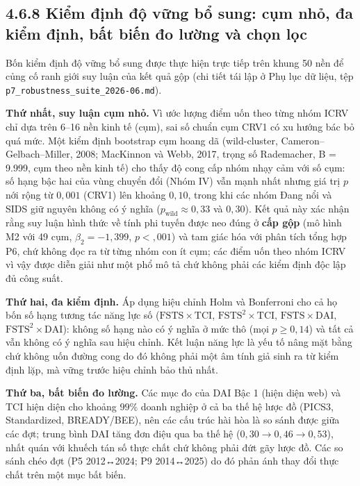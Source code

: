 \documentclass[
  a4paper,
  13pt]{extreport}
\begin{document}
\hypertarget{kiux1ec3m-ux111ux1ecbnh-ux111ux1ed9-vux1eefng-bux1ed5-sung-cux1ee5m-nhux1ecf-ux111a-kiux1ec3m-ux111ux1ecbnh-bux1ea5t-biux1ebfn-ux111o-lux1b0ux1eddng-vuxe0-chux1ecdn-lux1ecdc}{%
\subsection{4.6.8 Kiểm định độ vững bổ sung: cụm nhỏ, đa kiểm định, bất
biến đo lường và chọn
lọc}\label{kiux1ec3m-ux111ux1ecbnh-ux111ux1ed9-vux1eefng-bux1ed5-sung-cux1ee5m-nhux1ecf-ux111a-kiux1ec3m-ux111ux1ecbnh-bux1ea5t-biux1ebfn-ux111o-lux1b0ux1eddng-vuxe0-chux1ecdn-lux1ecdc}}

Bốn kiểm định độ vững bổ sung được thực hiện trực tiếp trên khung 50 nền
để củng cố ranh giới suy luận của kết quả gộp (chi tiết tái lập ở Phụ
lục dữ liệu, tệp \texttt{p7\_robustness\_suite\_2026-06.md}).

\textbf{Thứ nhất, suy luận cụm nhỏ.} Vì ước lượng điểm uốn theo từng
nhóm ICRV chỉ dựa trên 6--16 nền kinh tế (cụm), sai số chuẩn cụm CRV1 có
xu hướng bác bỏ quá mức. Một kiểm định bootstrap cụm hoang dã
(wild-cluster, Cameron--Gelbach--Miller, 2008; MacKinnon và Webb, 2017,
trọng số Rademacher, B = 9.999, cụm theo nền kinh tế) cho thấy độ cong
cấp nhóm nhạy cảm với số cụm: số hạng bậc hai của vùng chuyển đổi (Nhóm
IV) vẫn mạnh nhất nhưng giá trị \(p\) nới rộng từ \(0{,}001\) (CRV1) lên
khoảng \(0{,}10\), trong khi các nhóm Đang nổi và SIDS giữ nguyên không
có ý nghĩa (\(p_{\text{wild}} \approx 0{,}33\) và \(0{,}30\)). Kết quả
này xác nhận rằng suy luận hình thức về tính phi tuyến được neo đúng ở
\textbf{cấp gộp} (mô hình M2 với 49 cụm, \(\beta_2 = -1{,}399\),
\(p < {,}001\)) và tam giác hóa với phân tích tổng hợp P6, chứ không đọc
ra từ từng nhóm con ít cụm; các điểm uốn theo nhóm ICRV vì vậy được diễn
giải như một phổ mô tả chứ không phải các kiểm định độc lập đủ công
suất.

\textbf{Thứ hai, đa kiểm định.} Áp dụng hiệu chỉnh Holm và Bonferroni
cho cả họ bốn số hạng tương tác năng lực số
(\(\mathrm{FSTS}\times\mathrm{TCI}\),
\(\mathrm{FSTS}^2\times\mathrm{TCI}\),
\(\mathrm{FSTS}\times\mathrm{DAI}\),
\(\mathrm{FSTS}^2\times\mathrm{DAI}\)): không số hạng nào có ý nghĩa ở
mức thô (mọi \(p \ge 0{,}14\)) và tất cả vẫn không có ý nghĩa sau hiệu
chỉnh. Kết luận năng lực là yếu tố nâng mặt bằng chứ không uốn đường
cong do đó không phải một âm tính giả sinh ra từ kiểm định lặp, mà vững
trước hiệu chỉnh bảo thủ nhất.

\textbf{Thứ ba, bất biến đo lường.} Các mục đo của DAI Bậc 1 (hiện diện
web) và TCI hiện diện cho khoảng \(99\%\) doanh nghiệp ở cả ba thế hệ
lược đồ (PICS3, Standardized, BREADY/BEE), nên các cấu trúc hài hòa là
so sánh được giữa các đợt; trung bình DAI tăng đơn điệu qua ba thế hệ
(\(0{,}30 \to 0{,}46 \to 0{,}53\)), nhất quán với khuếch tán số thực
chất chứ không phải đứt gãy lược đồ. Các so sánh chéo đợt (P5 2012↔2024;
P9 2014↔2025) do đó phản ánh thay đổi thực chất trên một mục bất biến.
\end{document}
